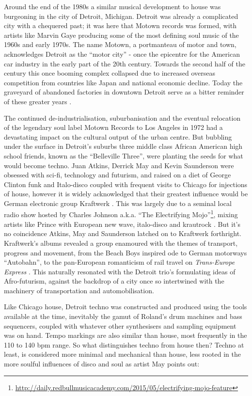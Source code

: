 Around the end of the 1980s a similar musical development to house was burgeoning in the city of Detroit, Michigan. Detroit was already a complicated city with a chequered past; it was here that Motown records was formed, with artists like Marvin Gaye producing some of the most defining soul music of the 1960s and early 1970s. The name Motown, a portmanteau of motor and town,  acknowledges Detroit  as the “motor city” - once the epicentre for the American car industry in the early part of the 20th century. Towards the second half of the century this once booming complex collapsed due to increased overseas competition from countries like Japan and national economic decline. Today the graveyard of abandoned factories in downtown Detroit serve as a bitter reminder of these greater years \citep{Sicko2010}.

The continued de-industrialisation, suburbanisation and the eventual relocation of the legendary soul label Motown Records to Los Angeles in 1972 had a devastating impact on the cultural output of the urban centre. But bubbling under the surface in Detroit's suburbs three middle class African American high school friends, known as the “Belleville Three”,  were planting the seeds for what would become techno. Juan Atkins, Derrick May and Kevin Saunderson were obsessed with sci-fi, technology and futurism, and raised on a diet of George Clinton funk and Italo-disco coupled with frequent visits to Chicago for injections of house, however it is widely acknowledged that their greatest influence would be German electronic group Kraftwerk \citep{Pope2011}. This was largely due to a seminal local radio show hosted by Charles Johnson a.k.a. “The Electrifying Mojo”\footnote{\url{http://daily.redbullmusicacademy.com/2015/05/electrifying-mojo-feature}}, mixing artists like Prince with European new wave, italo-disco and krautrock \citep{Reynolds2013, Sicko2010}. But it’s no coincidence Atkins, May and Saunderson latched on to Kraftwerk forthright. Kraftwerk’s albums revealed a group enamoured with the themes of transport, progress and movement, from the Beach Boys inspired ode to German motorways  “Autobahn”, to the pan-European romanticism of rail travel on \textit{Trans-Europe Express} \citep{Albiez2010}. This naturally resonated with the Detroit trio’s formulating ideas of Afro-futurism, against the backdrop of a city once so intertwined with the machinery of transportation and automobilisation.

Like Chicago house, Detroit techno was constructed and produced using the tools available at the time, inevitably the gamut of Roland’s drum machines and bass sequencers, coupled with whatever other synthesisers and sampling equipment was on hand. Tempo markings are also similar than house, most frequently in the 110 to 140 bpm range. So what distinguishes techno from house then? Techno at least, is considered more minimal and mechanical than house, less rooted in the more soulful influences of disco and soul as artist May points out:  

